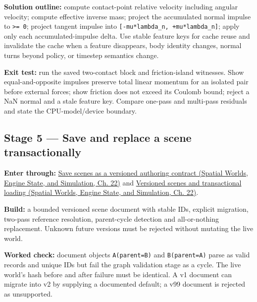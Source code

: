\textbf{Solution outline:} compute contact-point relative velocity including angular velocity; compute effective inverse mass; project the accumulated normal impulse to \texttt{\textgreater{}=\ 0}; project tangent impulse into \texttt{{[}-mu*lambda\_n,\ +mu*lambda\_n{]}}; apply only each accumulated-impulse delta. Use stable feature keys for cache reuse and invalidate the cache when a feature disappears, body identity changes, normal turns beyond policy, or timestep semantics change.

\textbf{Exit test:} run the saved two-contact block and friction-island witnesses. Show equal-and-opposite impulses preserve total linear momentum for an isolated pair before external forces; show friction does not exceed its Coulomb bound; reject a NaN normal and a stale feature key. Compare one-pass and multi-pass residuals and state the CPU-model/device boundary.

\subsection{Stage 5 --- Save and replace a scene transactionally}\label{06-engine-ii-ch042-stage-5-save-and-replace-a-scene-transactionally}

\hypertarget{06-engine-ii-ch042-stage-5-save-and-replace-a-scene-transactionally}{}

\textbf{Enter through:} \href{../05-Spatial-Worlds-Engine-State-and-Simulation/main.pdf\#nameddest=06-engine-ii-ch033-save-scenes-as-a-versioned-authoring-contract}{Save scenes as a versioned authoring contract (Spatial Worlds, Engine State, and Simulation, Ch. 22)} and \href{../05-Spatial-Worlds-Engine-State-and-Simulation/main.pdf\#nameddest=06-engine-ii-ch033-save-scenes-as-a-versioned-authoring-contract}{Versioned scenes and transactional loading (Spatial Worlds, Engine State, and Simulation, Ch. 22)}.

\textbf{Build:} a bounded versioned scene document with stable IDs, explicit migration, two-pass reference resolution, parent-cycle detection and all-or-nothing replacement. Unknown future versions must be rejected without mutating the live world.

\textbf{Worked check:} document objects \texttt{A(parent=B)} and \texttt{B(parent=A)} parse as valid records and unique IDs but fail the graph validation stage as a cycle. The live world's hash before and after failure must be identical. A v1 document can migrate into v2 by supplying a documented default; a v99 document is rejected as unsupported.

